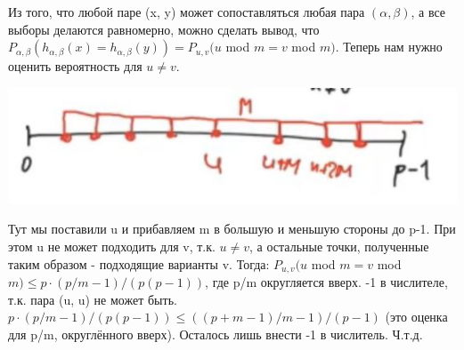 Из того, что любой паре (x, y) может сопоставляться любая пара $(\alpha, \beta)$, а все выборы делаются равномерно, можно сделать вывод, что $P_{\alpha, \beta}(h_{\alpha, \beta}(x) = h_{\alpha, \beta}(y)) = P_{u, v}(u$ mod $m = v$ mod $m)$. Теперь нам нужно оценить вероятность для $u \neq v$. \par
\includegraphics{images/76-83_segment_field} \par
Тут мы поставили u и прибавляем m в большую и меньшую стороны до p-1. При этом u не может подходить для v, т.к. $u \neq v$, а остальные точки, полученные таким образом - подходящие варианты v. Тогда: $P_{u, v}(u$ mod $m = v$ mod $m) \leqslant p \cdot (p/m -1)/(p(p-1))$, где p/m округляется вверх. -1 в числителе, т.к. пара (u, u) не может быть. $p \cdot (p/m -1)/(p(p-1)) \leqslant ((p+m-1)/m - 1)/(p-1)$ (это оценка для p/m, округлённого вверх). Осталось лишь внести -1 в числитель. Ч.т.д.

\setcounter{section}{79}

